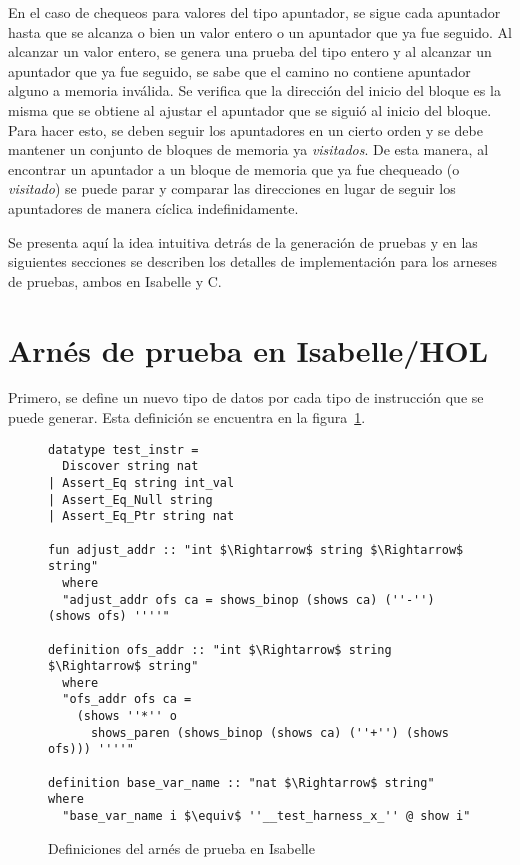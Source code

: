 En el caso de chequeos para valores del tipo apuntador, se sigue cada apuntador hasta que se alcanza o bien un valor entero o un apuntador que ya fue seguido.
Al alcanzar un valor entero, se genera una prueba del tipo entero y al alcanzar un apuntador que ya fue seguido, se sabe que el camino no contiene apuntador alguno a memoria inválida.
Se verifica que la dirección del inicio del bloque es la misma que se obtiene al ajustar el apuntador que se siguió al inicio del bloque.
Para hacer esto, se deben seguir los apuntadores en un cierto orden y se debe mantener un conjunto de bloques de memoria ya \textit{visitados}.
De esta manera, al encontrar un apuntador a un bloque de memoria que ya fue chequeado (o \textit{visitado}) se puede parar y comparar las direcciones en lugar de seguir los apuntadores de manera cíclica indefinidamente.

Se presenta aquí la idea intuitiva detrás de la generación de pruebas y en las siguientes secciones se describen los detalles de implementación para los arneses de pruebas, ambos en Isabelle y C.

\section{Arnés de prueba en Isabelle/HOL}

Primero, se define un nuevo tipo de datos por cada tipo de instrucción que se puede generar.
Esta definición se encuentra en la figura~\ref{fig:test_harness_datatype}.


\begin{figure}
\begin{lstlisting}[mathescape=true]
datatype test_instr =
  Discover string nat
| Assert_Eq string int_val
| Assert_Eq_Null string
| Assert_Eq_Ptr string nat

fun adjust_addr :: "int $\Rightarrow$ string $\Rightarrow$ string"
  where
  "adjust_addr ofs ca = shows_binop (shows ca) (''-'') (shows ofs) ''''"

definition ofs_addr :: "int $\Rightarrow$ string $\Rightarrow$ string"
  where
  "ofs_addr ofs ca =
    (shows ''*'' o
      shows_paren (shows_binop (shows ca) (''+'') (shows ofs))) ''''"

definition base_var_name :: "nat $\Rightarrow$ string" where
  "base_var_name i $\equiv$ ''__test_harness_x_'' @ show i"
\end{lstlisting}

\caption{Definiciones del arnés de prueba en Isabelle}
\label{fig:test_harness_datatype}
\end{figure}

